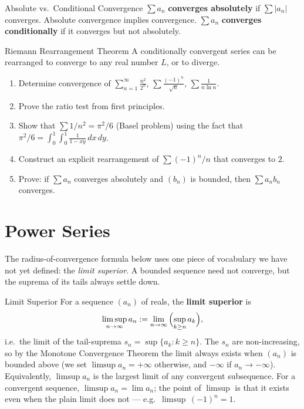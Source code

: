 \documentclass[12pt, openany]{book}
\theoremstyle{plain}
\theoremstyle{definition}
\theoremstyle{remark}
\begin{document}
\begin{defbox}{Absolute vs.\ Conditional Convergence}
$\sum a_n$ \textbf{converges absolutely} if $\sum |a_n|$ converges. Absolute convergence implies convergence.
$\sum a_n$ \textbf{converges conditionally} if it converges but not absolutely.
\end{defbox}
\color{black}

\begin{thmbox}{Riemann Rearrangement Theorem}
A conditionally convergent series can be rearranged to converge to any real number $L$, or to diverge.
\end{thmbox}
\color{black}

\begin{exbox}
\begin{enumerate}
  \item Determine convergence of $\sum_{n=1}^\infty \frac{n^2}{2^n}$, $\sum \frac{(-1)^n}{\sqrt{n}}$, $\sum \frac{1}{n \ln n}$.
  \item Prove the ratio test from first principles.
  \item Show that $\sum 1/n^2 = \pi^2/6$ (Basel problem) using the fact that $\pi^2/6 = \int_0^1\int_0^1 \frac{1}{1-xy}\,dx\,dy$.
  \item Construct an explicit rearrangement of $\sum (-1)^n/n$ that converges to $2$.
  \item Prove: if $\sum a_n$ converges absolutely and $(b_n)$ is bounded, then $\sum a_n b_n$ converges.
\end{enumerate}
\end{exbox}
\color{black}

\chapter{Power Series}
\color{black}

The radius-of-convergence formula below uses one piece of vocabulary we have not yet defined: the \emph{limit superior}.  A bounded sequence need not converge, but the suprema of its tails always settle down.

\begin{defbox}{Limit Superior}
For a sequence $(a_n)$ of reals, the \textbf{limit superior} is
\[ \limsup_{n\to\infty} a_n := \lim_{n\to\infty}\, \Bigl(\sup_{k \geq n} a_k\Bigr), \]
i.e.\ the limit of the tail-suprema $s_n = \sup\{a_k : k \geq n\}$.  The $s_n$ are non-increasing, so by the Monotone Convergence Theorem the limit always exists when $(a_n)$ is bounded above (we set $\limsup a_n = +\infty$ otherwise, and $-\infty$ if $a_n \to -\infty$).  Equivalently, $\limsup a_n$ is the largest limit of any convergent subsequence.  For a convergent sequence, $\limsup a_n = \lim a_n$; the point of $\limsup$ is that it exists even when the plain limit does not --- e.g.\ $\limsup\,(-1)^n = 1$.
\end{defbox}
\color{black}
\end{document}
